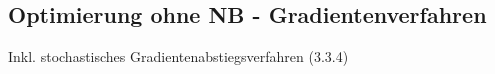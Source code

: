 \subsection{Optimierung ohne NB - Gradientenverfahren}
Inkl. stochastisches Gradientenabstiegsverfahren (3.3.4)